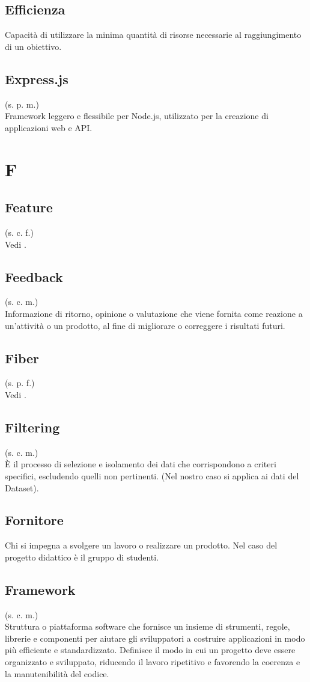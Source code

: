 \subsection{Efficienza}
Capacità di utilizzare la minima quantità di risorse necessarie al
raggiungimento di un obiettivo.
\subsection{Express.js}
(s. p. m.)\\
Framework leggero e flessibile per Node.js, utilizzato per la creazione di
applicazioni web e API.
\pagebreak
\section{F}
\subsection{Feature}
(s. c. f.)\\
Vedi .
\subsection{Feedback}
(s. c. m.)\\
Informazione di ritorno, opinione o valutazione che viene fornita come reazione a
un'attività o un prodotto, al fine di migliorare o correggere i risultati futuri.
\subsection{Fiber}
(s. p. f.)\\
Vedi .
\subsection{Filtering}
(s. c. m.)\\
È il processo di selezione e isolamento dei dati che corrispondono a criteri specifici, escludendo quelli non pertinenti. (Nel nostro caso si applica ai dati del Dataset).
\subsection{Fornitore}
Chi si impegna a svolgere un lavoro o realizzare un prodotto. Nel caso del
progetto didattico è il gruppo di studenti.
\subsection{Framework}
(s. c. m.)\\
Struttura o piattaforma software che fornisce un insieme di strumenti, regole,
librerie e componenti per aiutare gli sviluppatori a costruire applicazioni
in modo più efficiente e standardizzato. Definisce il modo in cui un progetto
deve essere organizzato e sviluppato, riducendo il lavoro ripetitivo e favorendo
la coerenza e la manutenibilità del codice.

